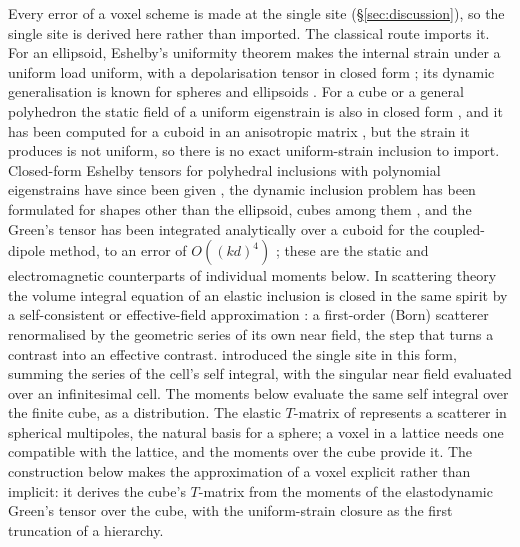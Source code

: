 \documentclass[preprint,review,12pt]{elsarticle}
\begin{document}
Every error of a voxel scheme is made at the single site (\S\ref{sec:discussion}), so the single
site is derived here rather than imported. The classical route imports it. For an ellipsoid,
Eshelby's uniformity theorem makes the internal strain under a uniform load uniform, with a
depolarisation tensor in closed form \citep{Eshelby1957,Eshelby1959,Mura1987}; its dynamic
generalisation is known for spheres and ellipsoids \citep{FuMura1983,Mikata1990,Michelitsch2003}. For a
cube or a general polyhedron the static field of a uniform eigenstrain is also in closed form
\citep{Chiu1977,Rodin1996,Nozaki2001}, and it has been computed for a cuboid in an anisotropic matrix
\citep{LeeJohnson1978}, but the strain it produces is not uniform, so there is no exact uniform-strain
inclusion to import. Closed-form Eshelby tensors for polyhedral
inclusions with polynomial eigenstrains have since been given \citep{WuZhangYin2021}, the dynamic
inclusion problem has been formulated for shapes other than the ellipsoid, cubes among them
\citep{WangMichelitsch2005}, and the Green's tensor has been integrated analytically over a cuboid for
the coupled-dipole method, to an error of $O((kd)^4)$ \citep{YurkinSmunev2023}; these are the static
and electromagnetic counterparts of individual moments below. In scattering theory the volume integral
equation of an elastic inclusion \citep{Gubernatis1977} is closed in the same spirit by a
self-consistent or effective-field approximation \citep{MalKnopoff1967,Kanaun2008}: a first-order (Born) scatterer
\citep{Wu1985} renormalised by the geometric series of its own near field, the step that turns a
contrast into an effective contrast. \citet{Nestor1996} introduced the single site in this form,
summing the series of the cell's self integral, with the singular near field evaluated over an
infinitesimal cell. The moments below evaluate the same self integral over the finite cube, as a
distribution. The elastic $T$-matrix of \citet{Waterman1976} represents a
scatterer in spherical multipoles, the natural basis for a sphere; a voxel in a lattice needs one
compatible with the lattice, and the moments over the cube provide it. The construction below makes the
approximation of a voxel explicit rather than implicit: it derives the cube's $T$-matrix from
the moments of the elastodynamic Green's tensor over the cube, with the uniform-strain closure as the
first truncation of a hierarchy.
\end{document}

